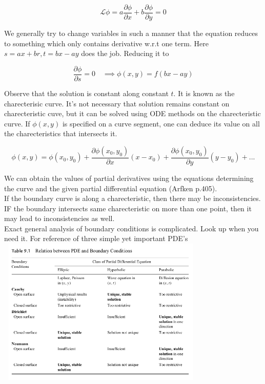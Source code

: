 \documentclass{report}
\begin{document}
$$\mathcal{L}\phi = a\frac{\partial\phi}{\partial x} + b\frac{\partial\phi}{\partial y} = 0$$

\noindent We generally try to change variables in such a manner that the equation reduces to something which only contains derivative w.r.t one term. Here $s = ax+br, t= bx-ay$ does the job. Reducing it to 

$$\frac{\partial\phi}{\partial s} = 0 \quad\implies \phi(x,y) = f(bx-ay)$$

\noindent Observe that the solution is constant along constant $t$. It is known as the charecterisic curve. It's not necessary that solution remains constant on charecteristic cuve, but it can be solved using ODE methods on the charecteristic curve. If $\phi(x,y)$ is specified on a curve segment, one can deduce its value on all the charecteristics that intersects it.

$$\phi(x,y) = \phi(x_0,y_0) + \frac{\partial \phi(x_0,y_0)}{\partial x}(x-x_0) + \frac{\partial\phi(x_0,y_0)}{\partial y}(y-y_0) + ...$$

\noindent We can obtain the values of partial derivatives using the equations determining the curve and the given partial differential equation (Arfken p.405).\\

\noindent If the boundary curve is along a charecteristic, then there may be inconsistencies. IF the boundary intersects same charecteristic on more than one point, then it may lead to inconsistencies as well.\\

\noindent Exact general analysis of boundary conditions is complicated. Look up when you need it. For reference of three simple yet important PDE's\\

\includegraphics[width=10cm, height=7cm]{./Images/boundary.png}
\end{document}
